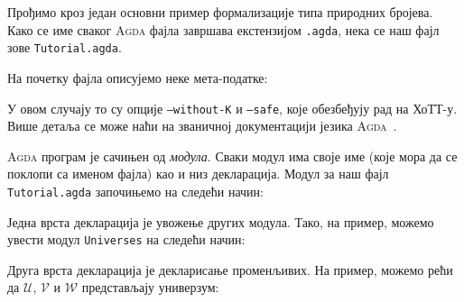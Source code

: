 Прођимо кроз један основни пример формализације типа природних бројева. Како се име сваког \textsc{Agda} фајла завршава екстензијом \texttt{.agda}, нека се наш фајл зове \texttt{Tutorial.agda}.

На почетку фајла описујемо неке мета-податке:
\begin{code}%
\>[0]\AgdaSymbol{\{-\#}\AgdaSpace{}%
\AgdaSpace{}%
\AgdaSpace{}%
\AgdaSpace{}%
\AgdaSymbol{\#-\}}\<%
\end{code}
У овом случају то су опције \texttt{--without-K} и \texttt{--safe}, које обезбеђују рад на ХоТТ-у. Више детаља се може наћи на званичној документацији језика \textsc{Agda}~\cite{agda_manual}.

\textsc{Agda} програм је сачињен од \emph{модула}. Сваки модул има своје име (које мора да се поклопи са именом фајла) као и низ декларација. Модул за наш фајл \texttt{Tutorial.agda} започињемо на следећи начин:
\begin{code}%
\>[0]\AgdaSpace{}%
\AgdaSpace{}%
\<%
\end{code}

Једна врста декларација је увожење других модула. Тако, на пример, можемо увести модул \texttt{Universes} на следећи начин: 
\begin{code}%
\>[0]\AgdaSpace{}%
\AgdaSpace{}%
\AgdaSpace{}%
\<%
\end{code}

Друга врста декларација је декларисање променљивих. На пример, можемо рећи да $\mathcal{U}$, $\mathcal{V}$ и $\mathcal{W}$ представљају универзум:
\begin{code}%
\>[0]\AgdaSpace{}%
\AgdaSpace{}%
\AgdaSpace{}%
\AgdaSpace{}%
\AgdaSymbol{:}\AgdaSpace{}%
\<%
\end{code}

